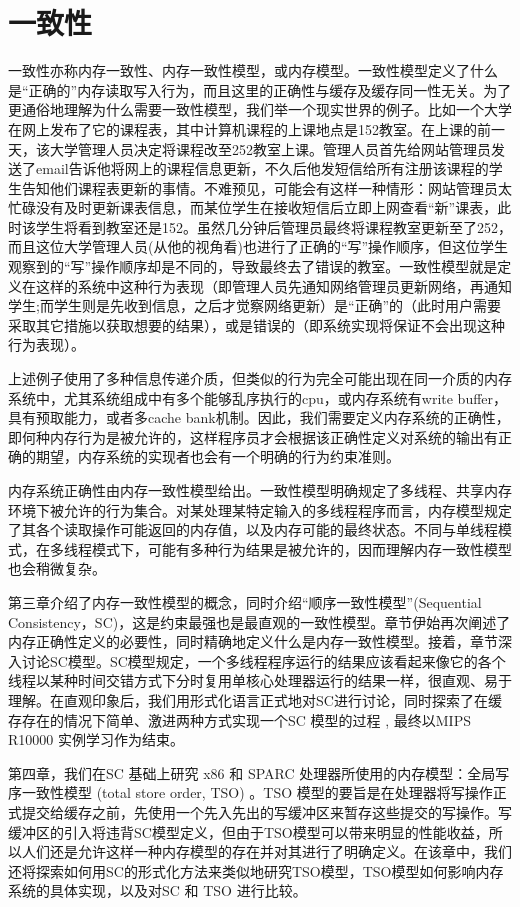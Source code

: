 \documentclass[UTF-8]{ctexrep}
\begin{document}
\section{一致性}
\par 一致性亦称内存一致性、内存一致性模型，或内存模型。一致性模型定义了什么是“正确的”内存读取写入行为，而且这里的正确性与缓存及缓存同一性无关。为了更通俗地理解为什么需要一致性模型，我们举一个现实世界的例子。比如一个大学在网上发布了它的课程表，其中计算机课程的上课地点是152教室。在上课的前一天，该大学管理人员决定将课程改至252教室上课。管理人员首先给网站管理员发送了email告诉他将网上的课程信息更新，不久后他发短信给所有注册该课程的学生告知他们课程表更新的事情。不难预见，可能会有这样一种情形：网站管理员太忙碌没有及时更新课表信息，而某位学生在接收短信后立即上网查看“新”课表，此时该学生将看到教室还是152。虽然几分钟后管理员最终将课程教室更新至了252，而且这位大学管理人员(从他的视角看)也进行了正确的“写”操作顺序，但这位学生观察到的“写”操作顺序却是不同的，导致最终去了错误的教室。一致性模型就是定义在这样的系统中这种行为表现（即管理人员先通知网络管理员更新网络，再通知学生;而学生则是先收到信息，之后才觉察网络更新）是“正确”的（此时用户需要采取其它措施以获取想要的结果），或是错误的（即系统实现将保证不会出现这种行为表现）。
\par 上述例子使用了多种信息传递介质，但类似的行为完全可能出现在同一介质的内存系统中，尤其系统组成中有多个能够乱序执行的cpu，或内存系统有write buffer，具有预取能力，或者多cache bank机制。因此，我们需要定义内存系统的正确性，即何种内存行为是被允许的，这样程序员才会根据该正确性定义对系统的输出有正确的期望，内存系统的实现者也会有一个明确的行为约束准则。
\par 内存系统正确性由内存一致性模型给出。一致性模型明确规定了多线程、共享内存环境下被允许的行为集合。对某处理某特定输入的多线程程序而言，内存模型规定了其各个读取操作可能返回的内存值，以及内存可能的最终状态。不同与单线程模式，在多线程模式下，可能有多种行为结果是被允许的，因而理解内存一致性模型也会稍微复杂。
\par 第三章介绍了内存一致性模型的概念，同时介绍“顺序一致性模型”(Sequential Consistency，SC)，这是约束最强也是最直观的一致性模型。章节伊始再次阐述了内存正确性定义的必要性，同时精确地定义什么是内存一致性模型。接着，章节深入讨论SC模型。SC模型规定，一个多线程程序运行的结果应该看起来像它的各个线程以某种时间交错方式下分时复用单核心处理器运行的结果一样，很直观、易于理解。在直观印象后，我们用形式化语言正式地对SC进行讨论，同时探索了在缓存存在的情况下简单、激进两种方式实现一个SC 模型的过程 , 最终以MIPS R10000 实例学习作为结束。
\par 第四章，我们在SC 基础上研究 x86 和 SPARC 处理器所使用的内存模型：全局写序一致性模型 (total store order, TSO) 。TSO 模型的要旨是在处理器将写操作正式提交给缓存之前，先使用一个先入先出的写缓冲区来暂存这些提交的写操作。写缓冲区的引入将违背SC模型定义，但由于TSO模型可以带来明显的性能收益，所以人们还是允许这样一种内存模型的存在并对其进行了明确定义。在该章中，我们还将探索如何用SC的形式化方法来类似地研究TSO模型，TSO模型如何影响内存系统的具体实现，以及对SC 和 TSO 进行比较。
\end{document}
